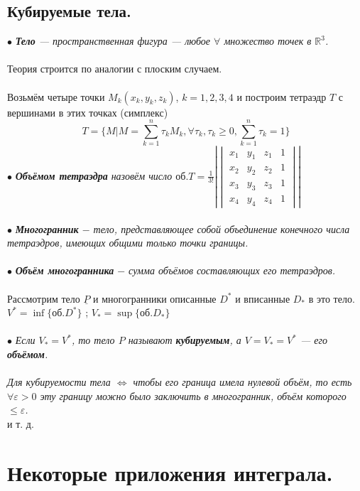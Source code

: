 \section{Кубируемые тела.}
$\bullet$ \textit{\textbf{Тело} --- пространственная фигура --- любое $\forall$ множество точек в $\mathbb{R}^3$.}\\\\
Теория строится по аналогии с плоским случаем.\\\\
Возьмём четыре точки $M_k(x_k, y_k, z_k)$, $k=1, 2, 3, 4$ и построим тетраэдр $T$ с вершинами в этих точках (симплекс)
$$ T = \{ M | M = \sum\limits_{k=1}^n \tau_k M_k, \forall \tau_k, \tau_k \geqslant 0, \sum\limits_{k=1}^n \tau_k = 1\}$$
$\bullet$ \textit{\textbf{Объёмом тетраэдра} назовём число 
	$\text{об.}T = \frac{1}{3!}\left| \begin{vmatrix}
		x_1& y_1 & z_1 & 1\\
		x_2& y_2 & z_2 & 1 \\
		x_3& y_3 & z_3 & 1  \\
		x_4& y_4 & z_4 & 1 
	\end{vmatrix}\right| $}\\\\
$\bullet$ \textit{\textbf{Многогранник} $-$ тело, представляющее собой объединение конечного числа тетраэдров, имеющих общими только точки границы.}\\\\
$\bullet$ \textit{\textbf{Объём многогранника} $-$ сумма объёмов составляющих его тетраэдров.}\\\\
Рассмотрим тело $\underline{P}$ и многогранники описанные $D^*$ и вписанные $D_*$ в это тело.\\
$V^* = \inf\{\text{об.}D^*\}$  ;  $V_* = \sup\{\text{об.}D_*\}$\\\\
$\bullet$ \textit{Если $V_* = V^*$, то тело $P$ называют \textbf{кубируемым}, а $V = V_* = V^*$ --- его \textbf{объёмом}.}\\\\
\textit{Для кубируемости тела $\Longleftrightarrow$ чтобы его граница имела нулевой объём, то есть $\forall \varepsilon > 0$ эту границу можно было заключить в многогранник, объём которого $\leqslant \varepsilon$.}\\
и т. д.
\chapter{Некоторые приложения интеграла.}

